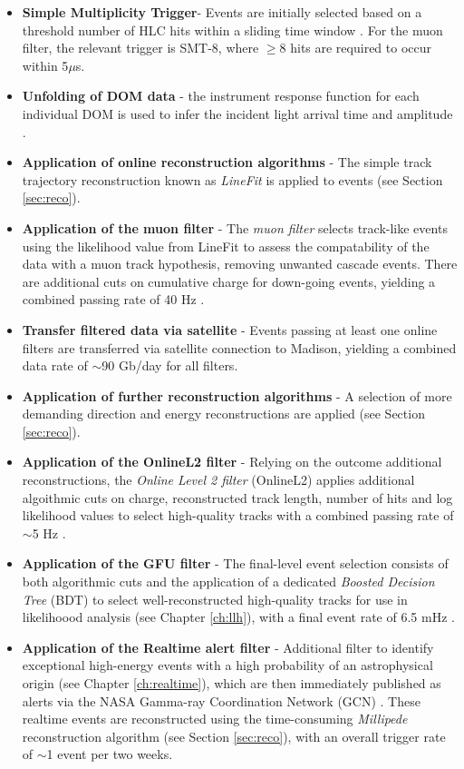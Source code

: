 \begin{itemize}
	\item \textbf{Simple Multiplicity Trigger}- Events are initially selected based on a threshold number of HLC hits within a sliding time window \cite{icecube_detector_17}. For the muon filter, the relevant trigger is SMT-8, where $\geq$8 hits are required to occur within 5$\mu$s.
	\item \textbf{Unfolding of DOM data} - the instrument response function for each individual DOM is used to infer the incident light arrival time and amplitude \cite{icecube_detector_17}.
	\item \textbf{Application of online reconstruction algorithms} - The simple track trajectory reconstruction known as \emph{LineFit} is applied to events (see Section \ref{sec:reco}).
	\item \textbf{Application of the muon filter} - The \emph{muon filter} selects track-like events using the likelihood value from LineFit to assess the compatability of the data with a muon track hypothesis, removing unwanted cascade events. There are additional cuts on cumulative charge for down-going events, yielding a combined passing rate of 40 Hz \cite{kintscher_thesis}.
	\item \textbf{Transfer filtered data via satellite } - Events passing at least one online filters are transferred via satellite connection to Madison, yielding a combined data rate of $\sim$90 Gb/day for all filters.
	\item \textbf{Application of further reconstruction algorithms} - A selection of more demanding direction and energy reconstructions are applied (see Section \ref{sec:reco}).
	\item \textbf{Application of the OnlineL2 filter} - Relying on the outcome additional reconstructions, the \emph{Online Level 2 filter} (OnlineL2) applies additional algoithmic cuts on charge, reconstructed track length, number of hits and log likelihood values to select high-quality tracks with a combined passing rate of $\sim$5 Hz .	
	\item \textbf{Application of the GFU filter} - The final-level event selection consists of both algorithmic cuts and the application of a dedicated \emph{Boosted Decision Tree} (BDT) to select well-reconstructed high-quality tracks for use in likelihoood analysis (see Chapter \ref{ch:llh}), with a final event rate of 6.5 mHz \cite{kintscher_thesis}.
	\item \textbf{Application of the Realtime alert filter} - Additional filter to identify exceptional high-energy events with a high probability of an astrophysical origin (see Chapter \ref{ch:realtime}), which are then immediately published as alerts via the NASA Gamma-ray Coordination Network (GCN) . These realtime events are reconstructed using the time-consuming \emph{Millipede} reconstruction algorithm (see Section \ref{sec:reco}), with an overall trigger rate of $\sim$1 event per two weeks.
\end{itemize}

